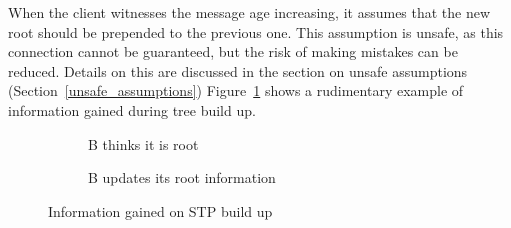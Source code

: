 When the client witnesses the message age increasing, it assumes that the new root should be prepended to the previous one.
This assumption is unsafe, as this connection cannot be guaranteed, but the risk of making mistakes can be reduced.
Details on this are discussed in the section on unsafe assumptions (Section~\ref{unsafe_assumptions})
Figure~\ref{fig:build_up} shows a rudimentary example of information gained during tree build up.
\begin{figure}[p]
    \begin{centering}
        \begin{subfigure}[b]{0.4\textwidth}
            \centering
            \caption{B thinks it is root}
        \end{subfigure}
        \hspace{1cm}
        \begin{subfigure}[b]{0.4\textwidth}
            \centering
            \caption{B updates its root information}
        \end{subfigure}
    \end{centering}
    \caption{Information gained on STP build up}
    \label{fig:build_up}
\end{figure}

